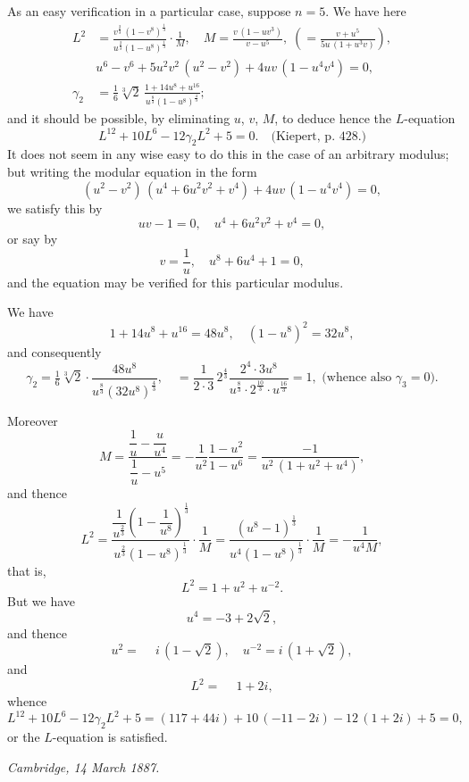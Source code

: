 \documentclass[11pt,a4paper]{book}
\begin{document}
As an easy verification in a particular case, suppose $n = 5$. We have here
\begin{align*}
L^2 &= \frac{v^{\frac{2}{3}}\, (1 - v^8)^{\frac{1}{3}}}{u^{\frac{2}{3}} (1 - u^8)^{\frac{1}{3}}} \cdot \frac{1}{M}, \quad
M = \frac{v\, (1 - uv^3)}{v - u^5}, \;
\left(= \frac{v + u^5}{5u\, (1 + u^3v)} \right),\\
&u^6 - v^6 + 5u^2v^2\, (u^2 - v^2) + 4uv\, (1 - u^4v^4) = 0,\\
\gamma_2 &= \tfrac{1}{6} \sqrt[3]{2}\,
\frac{1 + 14u^8 + u^{16}}{u^{\frac{8}{3}} (1 - u^8)^{\frac{4}{3}}};
\end{align*}
and it should be possible, by eliminating $u$, $v$, $M$, to deduce hence the $L$-equation
\[
L^{12} + 10L^6 - 12\gamma_2 L^2 + 5 = 0. \quad \text{(Kiepert, p.~428.)}
\]
It does not seem in any wise easy to do this in the case of an arbitrary modulus;
but writing the modular equation in the form
\[
(u^2 - v^2)\, (u^4 + 6u^2v^2 + v^4) + 4uv\, (1 - u^4v^4) = 0,
\]
we satisfy this by
\[
uv - 1 = 0, \quad u^4 + 6u^2v^2 + v^4 = 0,
\]
or say by
\[
v = \frac{1}{u}, \quad u^8 + 6u^4 + 1 = 0,
\]
and the equation may be verified for this particular modulus.

We have
\[
1 + 14u^8 + u^{16} = 48u^8, \quad (1 - u^8)^2 = 32u^8,
\]
and consequently
\[
\gamma_2 = \tfrac{1}{6} \sqrt[3]{2} \cdot \frac{48u^8}{u^{\frac{8}{3}} (32u^8)^{\frac{4}{3}}},
\quad = \frac{1}{2 \cdot 3}\, 2^{\frac{4}{3}}
\frac{2^4 \cdot 3u^8}{u^{\frac{8}{3}} \cdot 2^{\frac{10}{3}} \cdot u^{\frac{16}{3}}}
= 1, \text{ (whence also } \gamma_3 = 0\text{).}
\]

Moreover
\[
M = \frac{\dfrac{1}{u} - \dfrac{u}{u^4}}{\dfrac{1}{u} - u^5}
= -\frac{1}{u^2} \frac{1 - u^2}{1 - u^6}
= \frac{-1}{u^2\, (1 + u^2 + u^4)},
\]
and thence
\[
L^2 = \frac{\dfrac{1}{u^{\frac{2}{3}}} \left(1 - \dfrac{1}{u^8}\right)^{\frac{1}{3}}}{u^{\frac{2}{3}} (1 - u^8)^{\frac{1}{3}}} \cdot \frac{1}{M}
= \frac{(u^8 - 1)^{\frac{1}{3}}}{u^4 (1 - u^8)^{\frac{1}{3}}} \cdot \frac{1}{M}
= -\frac{1}{u^4 M},
\]
that is,
\[
L^2 = 1 + u^2 + u^{-2}.
\]
But we have
\[
u^4 = -3 + 2\sqrt{2},
\]
and thence
\[
u^2 = \phantom{-} i\,(1 - \sqrt{2}), \quad u^{-2} = i\,(1 + \sqrt{2}),
\]
and
\[
L^2 = \phantom{-} 1 + 2i,
\]
whence
\[
L^{12} + 10L^6 - 12\gamma_2 L^2 + 5
= (117 + 44i) + 10\, (-11 - 2i) - 12\, (1 + 2i) + 5 = 0,
\]
or the $L$-equation is satisfied.

\begin{flushright}
\textit{Cambridge, 14 March 1887.}
\end{flushright}
\end{document}
